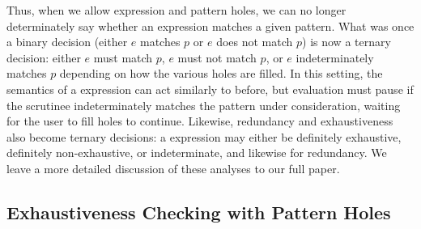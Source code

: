 
Thus, when we allow expression and pattern holes, we can no longer determinately say whether an expression matches a given pattern. What was once a binary decision (either $e$ matches $p$ or $e$ does not match $p$) is now a ternary decision: either $e$ must match $p$, $e$ must not match $p$, or $e$ indeterminately matches $p$ depending on how the various holes are filled. In this setting, the semantics of a  expression can act similarly to before, but evaluation must pause if the scrutinee indeterminately matches the pattern under consideration, waiting for the user to fill holes to continue.
Likewise, redundancy and exhaustiveness also become ternary decisions: a  expression may either be definitely exhaustive, definitely non-exhaustive, or indeterminate, and likewise for redundancy. We leave a more detailed discussion of these analyses to our full paper. 

\subsection{Exhaustiveness Checking with Pattern Holes}

